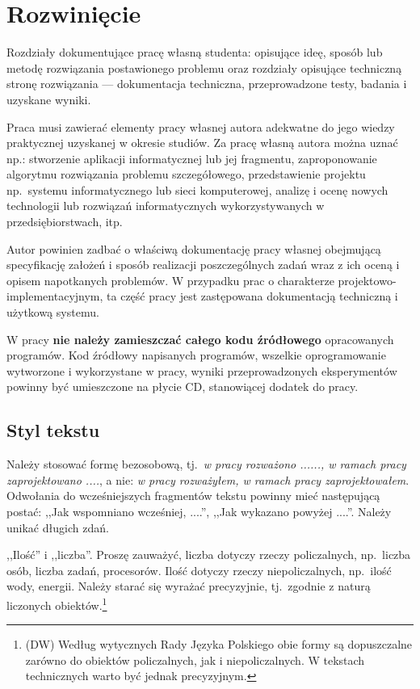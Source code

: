 
\chapter{Rozwinięcie}

Rozdziały dokumentujące pracę własną studenta: opisujące ideę, sposób lub metodę 
rozwiązania postawionego problemu oraz rozdziały opisujące techniczną stronę rozwiązania 
--- dokumentacja techniczna, przeprowadzone testy, badania i uzyskane wyniki. 

Praca musi zawierać elementy pracy własnej autora adekwatne do jego wiedzy praktycznej uzyskanej w
okresie studiów. Za pracę własną autora można uznać np.: stworzenie aplikacji informatycznej lub jej
fragmentu, zaproponowanie algorytmu rozwiązania problemu szczegółowego, przedstawienie projektu 
np.~systemu informatycznego lub sieci komputerowej, analizę i ocenę nowych technologii lub rozwiązań
informatycznych wykorzystywanych w przedsiębiorstwach, itp. 

Autor powinien zadbać o właściwą dokumentację pracy własnej obejmującą specyfikację założeń i 
sposób realizacji poszczególnych zadań
wraz z ich oceną i opisem napotkanych problemów. W przypadku prac o charakterze 
projektowo-implementacyjnym, ta część pracy jest zastępowana dokumentacją techniczną i użytkową systemu. 

W pracy \textbf{nie należy zamieszczać całego kodu źródłowego} opracowanych programów. Kod źródłowy napisanych
programów, wszelkie oprogramowanie wytworzone i wykorzystane w pracy, wyniki przeprowadzonych
eksperymentów powinny być umieszczone na płycie CD, stanowiącej dodatek do pracy.

\section*{Styl tekstu}
Należy stosować formę bezosobową, tj.~\emph{w pracy rozważono ......, 
w ramach pracy zaprojektowano ....}, a nie: \emph{w pracy rozważyłem, w ramach pracy zaprojektowałem}. 
Odwołania do wcześniejszych fragmentów tekstu powinny mieć następującą postać: ,,Jak wspomniano wcześniej, ....'', 
,,Jak wykazano powyżej ....''. Należy unikać długich zdań. 

,,Ilość'' i ,,liczba''. Proszę zauważyć, liczba dotyczy rzeczy policzalnych, np.~liczba osób, liczba zadań, procesorów. 
Ilość dotyczy rzeczy niepoliczalnych, np.~ilość wody, energii. Należy starać się wyrażać precyzyjnie, tj.~zgodnie 
z naturą liczonych obiektów.\footnote{(DW) Według wytycznych Rady Języka Polskiego obie formy są dopuszczalne
zarówno do obiektów policzalnych, jak i niepoliczalnych. W tekstach technicznych warto być jednak precyzyjnym.}

